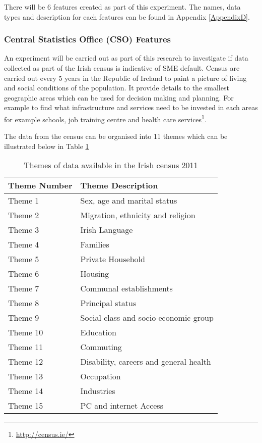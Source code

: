There will be 6 features created as part of this experiment. The names, data types and description for each features can be found in Appendix \ref{AppendixD}.


\subsubsection{Central Statistics Office (CSO) Features}
An experiment will be carried out as part of this research to investigate if data collected as part of the Irish census is indicative of SME default. Census are carried out every 5 years in the Republic of Ireland to paint a picture of living and social conditions of the population. It provide details to the smallest geographic areas which can be used for decision making and planning. For example to find what infrastructure and services need to be invested in each areas for example schools, job training centre and health care services\footnote{\url{http://census.ie/}}. 

The data from the census can be organised into 11 themes which can be illustrated below in Table \ref{table:censusThemes}

\begin{table}[H]
	\centering
	\small
	\begin{tabular}{|l|l|}
		\hline
		\textbf{Theme Number} & \textbf{Theme Description} \\ \hline
		Theme 1    & Sex, age and marital status \\ \hline
		Theme 2    & Migration, ethnicity and religion \\ \hline
		Theme 3    & Irish Language \\ \hline
		Theme 4    & Families \\ \hline
		Theme 5    & Private Household \\ \hline
		Theme 6    & Housing \\ \hline
		Theme 7	   & Communal establishments \\ \hline
		Theme 8    & Principal status \\ \hline
		Theme 9    & Social class and socio-economic group \\ \hline
		Theme 10   & Education \\ \hline
		Theme 11   & Commuting \\ \hline	
		Theme 12   & Disability, careers and general health \\ \hline		
		Theme 13   & Occupation \\ \hline
		Theme 14   & Industries \\ \hline
		Theme 15   & PC and internet Access \\ \hline			
	\end{tabular}
	\caption{Themes of data available in the Irish census 2011}
	\label{table:censusThemes}
\end{table}


